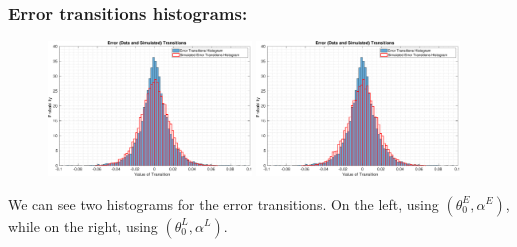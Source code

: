 \documentclass[aspectratio=169]{beamer}\usepackage[utf8]{inputenc}
\begin{document}

\begin{frame}\frametitle{Error transitions histograms:}

\begin{figure}[ht!]
\centering
\includegraphics[width=0.48\textwidth]{../../MATLAB_Files/Results/histograms/classic/Optimal.eps}
\includegraphics[width=0.48\textwidth]{../../MATLAB_Files/Results/histograms/classic/Lamperti_Optimal.eps}
\end{figure}

We can see two histograms for the error transitions. On the left, using $(\theta_0^E,\alpha^E)$, while on the right, using $(\theta_0^L,\alpha^L)$.

\end{frame}

\end{document}
